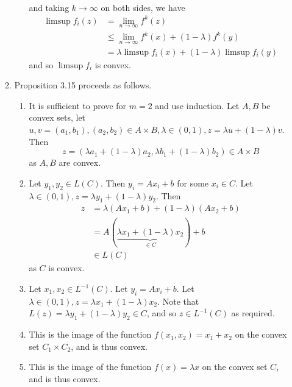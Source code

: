 \begin{enumerate}[label*=Ex \arabic*.]
\begin{enumerate}
\begin{enumerate}
\begin{align}
      \end{align} and taking $k \rightarrow \infty$ on both sides, we
      have
      \begin{align}
        \label{eq:5}
        \limsup f_{i}(z) &= \lim_{n \rightarrow \infty} f^{k}(z) \\
        &\leq \lim_{n \rightarrow \infty} f^{k}(x) + (1- \lambda)
        f^{k}(y) \\
        &= \lambda \limsup f_{i}(x) + (1-\lambda) \limsup f_{i}(y) 
      \end{align} and so $\limsup f_{i}$ is convex.
    \end{enumerate}
  \item Proposition 3.15 proceeds as follows.
    \begin{enumerate}
    \item It is sufficient to prove for $m = 2$ and use induction. Let
      $A, B$ be convex sets, let $u, v = (a_{1}, b_{1}), (a_{2},
      b_{2}) \in A \times B, \lambda \in (0, 1), z = \lambda u +
      (1-\lambda)v$.  Then
      \begin{equation}
        \label{eq:7}
        z = (\lambda a_{1} + (1-\lambda) a_{2}, \lambda b_{1} +
        (1-\lambda) b_{2}) \in A \times B
      \end{equation} as $A, B$ are convex.
    \item Let $y_{1}, y_{2} \in L(C)$. Then $y_{i} = Ax_{i} + b$ for
      some $x_{i} \in C$. Let $\lambda \in (0, 1), z = \lambda y_{1} +
      (1-\lambda) y_{2}$.  Then
      \begin{align}
        \label{eq:8}
        z &= \lambda (A x_{1} + b) + (1-\lambda)(Ax_{2} + b) \\
        &= A(\underbrace{\lambda x_{1} + (1-\lambda) x_{2}}_{\in C}) + b \\
        &\in L(C)
      \end{align} as $C$ is convex. 
    \item Let $x_{1}, x_{2} \in L^{-1}(C)$.  Let $y_{i} = Ax_{i} + b$.
      Let $\lambda \in (0, 1), z = \lambda x_{1} + (1-\lambda) x_{2}$.
      Note that $L(z) = \lambda y_{1} + (1-\lambda) y_{2} \in C$, and
      so $z \in L^{-1}(C)$ as required.
    \item This is the image of the function $f(x_{1}, x_{2}) = x_{1} +
      x_{2}$ on the convex set $C_{1} \times C_{2}$, and is thus convex.
    \item This is the image of the function $f(x) = \lambda x$ on the
      convex set $C$, and is thus convex.
    \end{enumerate}
  \end{enumerate}
  

\end{enumerate}
